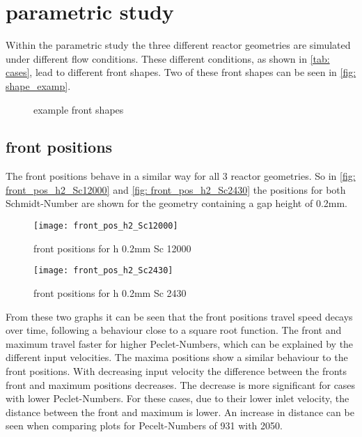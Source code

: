 \documentclass[../thesis.tex]{subfiles}
\begin{document}
\chapter{parametric study}
\label{chp: para_stud}
Within the parametric study the three different reactor geometries are simulated under different flow conditions. These different conditions, as shown in \autoref{tab: cases}, lead to different front shapes. Two of these front shapes can be seen in \autoref{fig: shape_examp}.
\begin{figure}[htb]
	\centering
	\qquad
	\caption{example front shapes}%
	\label{fig: shape_examp}%
\end{figure}

\section{front positions}

The front positions behave in a similar way for all 3 reactor geometries. So in \autoref{fig: front_pos_h2_Sc12000} and \autoref{fig: front_pos_h2_Sc2430} the positions for both Schmidt-Number are shown for the geometry containing a gap height of 0.2mm.
\begin{figure}[htbp]
	\centering
	\texttt{[image: front\_pos\_h2\_Sc12000]}
	\caption{front positions for h 0.2mm Sc 12000\label{fig: front_pos_h2_Sc12000}}\bigskip
	\texttt{[image: front\_pos\_h2\_Sc2430]}
	\caption{front positions for h 0.2mm Sc 2430\label{fig: front_pos_h2_Sc2430}}
\end{figure}

From these two graphs it can be seen that the front positions travel speed decays over time, following a behaviour close to a  square root function. The front and maximum travel faster for higher Peclet-Numbers, which can be explained by the different input velocities. The maxima positions show a similar behaviour to the front positions. 
With decreasing input velocity the difference between the fronts front and maximum positions decreases. The decrease is more significant for cases with lower Peclet-Numbers. For these cases, due to their lower inlet velocity, the distance between the front and maximum is lower. An increase in distance can be seen when comparing plots for Pecelt-Numbers of 931 with 2050.
\end{document}
